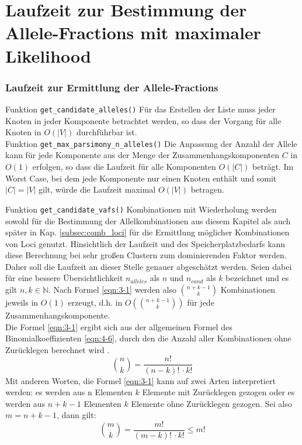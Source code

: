 \section{Laufzeit zur Bestimmung der Allele-Fractions mit maximaler Likelihood}
\subsubsection{Laufzeit zur Ermittlung der Allele-Fractions}
Funktion \lstinline|get_candidate_alleles()| 
Für das Erstellen der Liste muss jeder Knoten in jeder Komponente betrachtet werden, so dass der Vorgang für alle Knoten in $ O(|V|) $ durchführbar ist.\\

Funktion \lstinline|get_max_parsimony_n_alleles()|
Die Anpassung der Anzahl der Allele kann für jede Komponente aus der Menge der Zusammenhangskomponenten $ C $ in $ O(1) $ erfolgen, so dass die Laufzeit für alle Komponenten $ O(|C|) $ beträgt. Im Worst Case, bei dem jede Komponente nur einen Knoten enthält und somit $ |C| = |V| $ gilt, würde die Laufzeit maximal $ O(|V|) $ betragen.

Funktion \lstinline|get_candidate_vafs()| \label{subsubsec:cand_vafs}
Kombinationen mit Wiederholung werden sowohl für die Bestimmung der Allelkombinationen aus diesem Kapitel als auch später in Kap. \ref{subsec:comb_loci} für die Ermittlung möglicher Kombinationen von Loci genutzt. Hinsichtlich der Laufzeit und des Speicherplatzbedarfs kann diese Berechnung bei sehr großen Clustern zum dominierenden Faktor werden. Daher soll die Laufzeit an dieser Stelle genauer abgeschätzt werden. Seien dabei für eine bessere Übersichtlichkeit $ n_{alleles} $ als $ n $ und $ n_{cand} $ als $k$ bezeichnet und es gilt $n, k \in \mathds{N} $. Nach Formel \eqref{eqn:3-1} werden also $ \binom{n + k - 1}{k} $ Kombinationen jeweils in $O(1)$ erzeugt, d.h. in $ O(\binom{n + k - 1}{k}) $ für jede Zusammenhangskomponente. \\

Die Formel \eqref{eqn:3-1} ergibt sich aus der allgemeinen Formel des Binomialkoeffizienten \eqref{eqn:4-6}, durch den die Anzahl aller Kombinationen ohne Zurücklegen berechnet wird \cite{tb_stat}. 
\begin{equation} \label{eqn:4-6}
\tag{4-6}
\binom{n}{k} = \frac{n!}{(n-k)!\, \cdotp k!}
\end{equation} 
Mit anderen Worten, die Formel \eqref{eqn:3-1} kann auf zwei Arten interpretiert werden: es werden aus n Elementen $ k $ Elemente mit Zurücklegen gezogen oder es werden aus $ n + k - 1 $ Elementen $ k $ Elemente ohne Zurücklegen gezogen. Sei also  $ m = n + k - 1 $, dann gilt:
\begin{equation} \label{eqn:4-7}
\tag{4-7}
\binom{m}{k} = \frac{m!}{(m - k)!\, \cdotp k!} \leq m!
\end{equation} 

